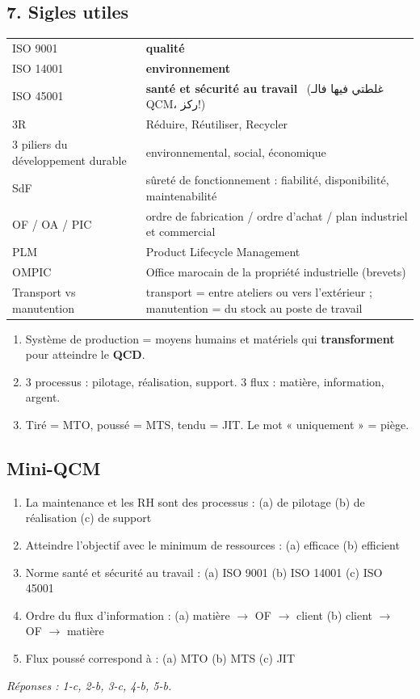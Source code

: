 \documentclass[11pt,a4paper]{article}
\newcommand{\ar}[1]{\textarabic{#1}}
\begin{document}
\subsection*{7. Sigles utiles}
\begin{center}
\begin{tabularx}{\linewidth}{l X}
\toprule
ISO 9001 & \textbf{qualité} \\
ISO 14001 & \textbf{environnement} \\
ISO 45001 & \textbf{santé et sécurité au travail} \ \ar{(غلطتي فيها فالـ QCM، ركز!)} \\
3R & Réduire, Réutiliser, Recycler \\
3 piliers du développement durable & environnemental, social, économique \\
SdF & sûreté de fonctionnement : fiabilité, disponibilité, maintenabilité \\
OF / OA / PIC & ordre de fabrication / ordre d'achat / plan industriel et commercial \\
PLM & Product Lifecycle Management \\
OMPIC & Office marocain de la propriété industrielle (brevets) \\
Transport vs manutention & transport = entre ateliers ou vers l'extérieur ; manutention = du stock au poste de travail \\
\bottomrule
\end{tabularx}
\end{center}

\begin{resume}
\begin{enumerate}
\item Système de production = moyens humains et matériels qui \textbf{transforment} pour atteindre le \textbf{QCD}.
\item 3 processus : pilotage, réalisation, support. 3 flux : matière, information, argent.
\item Tiré = MTO, poussé = MTS, tendu = JIT. Le mot « uniquement » = piège.
\end{enumerate}
\end{resume}

\subsection*{Mini-QCM}
\begin{enumerate}
\item La maintenance et les RH sont des processus : (a) de pilotage (b) de réalisation (c) de support
\item Atteindre l'objectif avec le minimum de ressources : (a) efficace (b) efficient
\item Norme santé et sécurité au travail : (a) ISO 9001 (b) ISO 14001 (c) ISO 45001
\item Ordre du flux d'information : (a) matière $\rightarrow$ OF $\rightarrow$ client (b) client $\rightarrow$ OF $\rightarrow$ matière
\item Flux poussé correspond à : (a) MTO (b) MTS (c) JIT
\end{enumerate}
{\small\textit{Réponses : 1-c, 2-b, 3-c, 4-b, 5-b.}}
\end{document}
